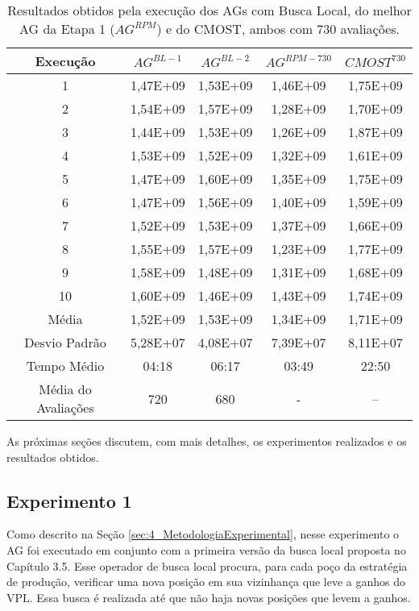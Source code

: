 \begin{table}[H]
\centering
\caption{Resultados obtidos pela execução dos AGs com Busca Local, do melhor AG da Etapa 1 ($AG^{RPM}$) e do CMOST, ambos com 730 avaliações.}
\label{tab:results2_1}
\begin{tabular}{|c|c|c|c|c|}
\hline
Execução & $AG^{BL-1}$ & $AG^{BL-2}$ & $AG^{RPM-730}$ & $CMOST^{730}$ \\ \hline
1 & 1,47E+09 & 1,53E+09 & 1,46E+09 & 1,75E+09 \\ \hline
2 & 1,54E+09 & 1,57E+09 & 1,28E+09 & 1,70E+09 \\ \hline
3 & 1,44E+09 & 1,53E+09	& 1,26E+09 & 1,87E+09 \\ \hline
4 & 1,53E+09 & 1,52E+09 & 1,32E+09 & 1,61E+09 \\ \hline
5 & 1,47E+09 & 1,60E+09 & 1,35E+09 & 1,75E+09 \\ \hline
6 & 1,47E+09 & 1,56E+09 & 1,40E+09 & 1,59E+09 \\ \hline
7 & 1,52E+09 & 1,53E+09 & 1,37E+09 & 1,66E+09 \\ \hline
8 & 1,55E+09 & 1,57E+09 & 1,23E+09 & 1,77E+09 \\ \hline
9 & 1,58E+09 & 1,48E+09 & 1,31E+09 & 1,68E+09 \\ \hline
10 & 1,60E+09 & 1,46E+09 & 1,43E+09 & 1,74E+09\\ \hline
Média & 1,52E+09 & 1,53E+09 & 1,34E+09 & 1,71E+09\\ \hline
Desvio Padrão & 5,28E+07 & 4,08E+07 & 7,39E+07 & 8,11E+07\\ \hline
Tempo Médio & 04:18 & 06:17 & 03:49 & 22:50\\ \hline
Média do Avaliações & 720 & 680	 & - & --\\ \hline

\end{tabular}
\end{table}

As próximas seções discutem, com mais detalhes, os experimentos realizados e os resultados obtidos. 


\subsection{Experimento 1}
\label{ch:5_Experimento6}
Como descrito na Seção \ref{sec:4_MetodologiaExperimental}, nesse experimento o AG foi executado em conjunto com a primeira versão da busca local proposta no Capítulo 3.5. Esse operador de busca local procura, para cada poço da estratégia de produção, verificar uma nova posição em sua vizinhança que leve a ganhos do VPL. Essa busca é realizada até que não haja novas posições que levem a ganhos.

